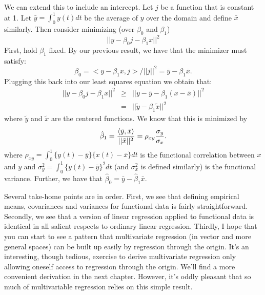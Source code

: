 We can extend this to include an intercept. Let $j$ be a function
that is constant at 1. 
Let $\bar y = \int_0^1 y(t)dt$ be the average of $y$ over
the domain and define $\bar x$ similarly.
Then consider minimizing (over $\beta_0$ and $\beta_1$)
$$
|| y - \beta_0 j - \beta_1 x ||^2
$$
First, hold $\beta_1$ fixed. By our previous result, we
have that the minimizer must satisfy:
$$
\beta_0 = <y - \beta_1 x, j> / ||j||^2 = 
\bar y - \beta_1 \bar x.
$$
Plugging this back into our least squares equation we
obtain that:
\begin{eqnarray*}
|| y - \beta_0 j - \beta_1 x ||^2 & \geq &
|| y - \bar y - \beta_1 (x - \bar x)||^2 \\
& = & || \tilde y - \beta_1 \tilde x||^2
\end{eqnarray*}
where $\tilde y$ and $\tilde x$ are the centered functions.  
We know that this is minimized by
$$
\hat \beta_1 = \frac{\langle \tilde y, \tilde x \rangle}{||\tilde x||^2} = \rho_{xy}\frac{\sigma_y}{\sigma_x}.
$$
where $\rho_{xy} = \int_0^1 \{y(t) - \bar y\} \{x(t) - \bar x\} dt$ is the
functional correlation between $x$ and $y$ and $\sigma_y^2 =
\int_0^1 \{y(t) - \bar y\}^2 dt$ (and $\sigma_x^2$ is defined similarly) is the functional variance.
Further, we have that $\hat \beta_0 = \bar y - \hat \beta_1 \bar x$.

Several take-home points are in order. First, we see that defining
empirical means, covariances and variances for functional data is
fairly straightforward. Secondly, we see that a version of linear
regression applied to functional data is identical in all salient
respects to ordinary linear regression. Thirdly, I hope that you
can start to see a pattern that multivariate regression (in vector
and more general spaces) can be built up easily by regression through
the origin. It's an interesting, though tedious, 
exercise to derive multivariate regression only allowing
oneself access to regression through the origin. 
We'll find a more convenient derivation in the next
chapter. However, it's oddly pleasant that so much of multivariable
regression relies on this simple result.

 








